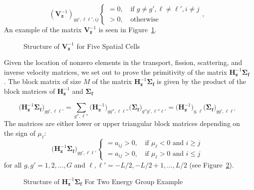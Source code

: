 \begin{equation}
		(\mathbf{V}_{\mathbf{z}}^{-1})_{gg',\ell \ell', ij}
	\begin{cases}
 		= 0, \quad \text{if } g \neq g', \ell \neq \ell', i \neq j \\
		> 0, \quad \text{otherwise}
	\end{cases},
\end{equation}
An example of the matrix $\mathbf{V}_{\mathbf{z}}^{-1}$ is seen in Figure~\ref{fig:iVz}.

\begin{figure}[!htbp]
	\centering
	\resizebox{0.75\textwidth}{!}{}
	\caption{Structure of $\mathbf{V}_{\mathbf{z}}^{-1}$ for Five Spatial Cells}\label{fig:iVz}
\end{figure}

Given the location of nonzero elements in the transport, fission, scattering, and inverse velocity matrices, we set out to prove the primitivity of the matrix $\mathbf{H}_\mathbf{z}^{-1}\mathbf{\Sigma_{f}}$. The block matrix of size $M$ of the matrix $ \mathbf{H}_{\mathbf{z}}^{-1} \mathbf{\Sigma_{f}}$ is given by the product of the block matrices of $\mathbf{H}_{\mathbf{z}}^{-1}$ and $\mathbf{\Sigma_{f}}$

\begin{equation}
	\big ( \mathbf{H}_{\mathbf{z}}^{-1} \mathbf{\Sigma_{f}} \big )_{gg',\ell\ell'} = \sum_{g'',\ell''} \big (\mathbf{H}_{\mathbf{z}}^{-1} \big )_{gg'',\ell \ell''}  \big (\mathbf{\Sigma_{f}} \big)_{g''g',\ell'' \ell'} = \big ( \mathbf{H}_{\mathbf{z}}^{-1} \big )_{g,\ell} \big ( \mathbf{\Sigma_{f}} \big )_{gg',\ell \ell'}
 \end{equation}
The matrices are either lower or upper triangular block matrices depending on the sign of $\mu_{\ell}$:
\begin{equation}
		\big ( \mathbf{H}_{\mathbf{z}}^{-1} \mathbf{\Sigma_{f}} \big )_{gg',\ell \ell'}
	\begin{cases}
 		= a_{ij} > 0, \quad \text{if } \mu_{\ell} < 0 \text{ and } i \geq j \\
 		= a_{ij} > 0, \quad \text{if } \mu_{\ell} > 0 \text{ and } i \leq j
	\end{cases}
\end{equation}
for all $g, g' = 1, 2, \dots, G$ and $\ell, \ell' = -L/2, -L/2+1, \dots, L/2$ (see Figure~\ref{fig:iHF}). 

\clearpage

\begin{figure}[!htbp]
	\centering
	\resizebox{0.75\textwidth}{!}{}
	\caption{Structure of $\mathbf{H}_{\mathbf{z}}^{-1}\mathbf{\Sigma_{f}}$ For Two Energy Group Example}\label{fig:iHF}
\end{figure}

